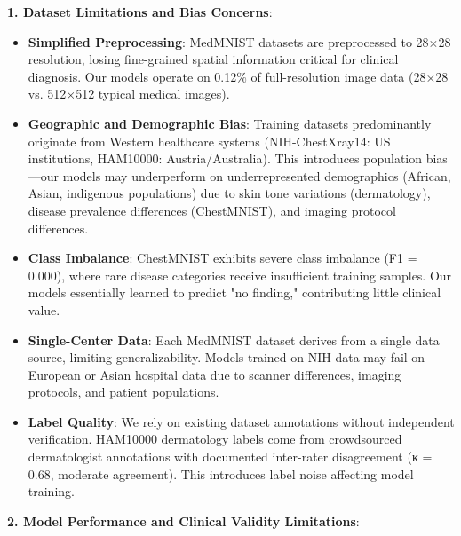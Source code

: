 \documentclass[12pt,a4paper]{article}
\begin{document}
\textbf{1. Dataset Limitations and Bias Concerns}:

\begin{itemize}
    \item \textbf{Simplified Preprocessing}: MedMNIST datasets are preprocessed to 28×28 resolution, losing fine-grained spatial information critical for clinical diagnosis. Our models operate on 0.12\% of full-resolution image data (28×28 vs. 512×512 typical medical images).
    
    \item \textbf{Geographic and Demographic Bias}: Training datasets predominantly originate from Western healthcare systems (NIH-ChestXray14: US institutions, HAM10000: Austria/Australia). This introduces population bias—our models may underperform on underrepresented demographics (African, Asian, indigenous populations) due to skin tone variations (dermatology), disease prevalence differences (ChestMNIST), and imaging protocol differences.
    
    \item \textbf{Class Imbalance}: ChestMNIST exhibits severe class imbalance (F1 = 0.000), where rare disease categories receive insufficient training samples. Our models essentially learned to predict "no finding," contributing little clinical value.
    
    \item \textbf{Single-Center Data}: Each MedMNIST dataset derives from a single data source, limiting generalizability. Models trained on NIH data may fail on European or Asian hospital data due to scanner differences, imaging protocols, and patient populations.
    
    \item \textbf{Label Quality}: We rely on existing dataset annotations without independent verification. HAM10000 dermatology labels come from crowdsourced dermatologist annotations with documented inter-rater disagreement (κ = 0.68, moderate agreement). This introduces label noise affecting model training.
\end{itemize}

\textbf{2. Model Performance and Clinical Validity Limitations}:
\end{document}

